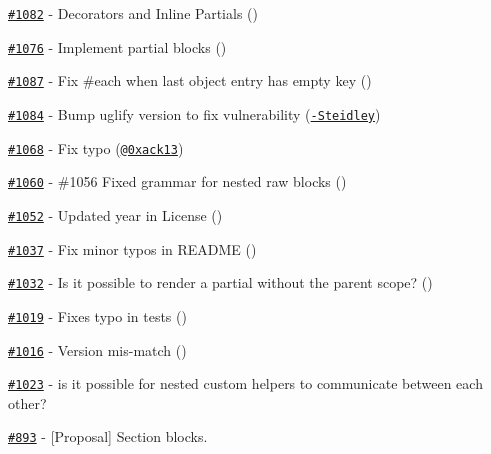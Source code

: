 \begin{DoxyItemize}
\item \href{https://github.com/wycats/handlebars.js/pull/1082}{\tt \#1082} -\/ Decorators and Inline Partials (\href{https://api.github.com/users/kpdecker}{\tt })
\item \href{https://github.com/wycats/handlebars.js/pull/1076}{\tt \#1076} -\/ Implement partial blocks (\href{https://api.github.com/users/kpdecker}{\tt })
\item \href{https://github.com/wycats/handlebars.js/pull/1087}{\tt \#1087} -\/ Fix \#each when last object entry has empty key (\href{https://api.github.com/users/denniskuczynski}{\tt })
\item \href{https://github.com/wycats/handlebars.js/pull/1084}{\tt \#1084} -\/ Bump uglify version to fix vulnerability (\href{https://api.github.com/users/John-Steidley}{\tt -\/\+Steidley})
\item \href{https://github.com/wycats/handlebars.js/pull/1068}{\tt \#1068} -\/ Fix typo (\href{https://api.github.com/users/0xack13}{\tt @0xack13})
\item \href{https://github.com/wycats/handlebars.js/pull/1060}{\tt \#1060} -\/ \#1056 Fixed grammar for nested raw blocks (\href{https://api.github.com/users/ericbn}{\tt })
\item \href{https://github.com/wycats/handlebars.js/pull/1052}{\tt \#1052} -\/ Updated year in License (\href{https://api.github.com/users/maqnouch}{\tt })
\item \href{https://github.com/wycats/handlebars.js/pull/1037}{\tt \#1037} -\/ Fix minor typos in R\+E\+A\+D\+M\+E (\href{https://api.github.com/users/tomxtobin}{\tt })
\item \href{https://github.com/wycats/handlebars.js/issues/1032}{\tt \#1032} -\/ Is it possible to render a partial without the parent scope? (\href{https://api.github.com/users/aputinski}{\tt })
\item \href{https://github.com/wycats/handlebars.js/pull/1019}{\tt \#1019} -\/ Fixes typo in tests (\href{https://api.github.com/users/aymerick}{\tt })
\item \href{https://github.com/wycats/handlebars.js/issues/1016}{\tt \#1016} -\/ Version mis-\/match (\href{https://api.github.com/users/mayankdedhia}{\tt })
\item \href{https://github.com/wycats/handlebars.js/issues/1023}{\tt \#1023} -\/ is it possible for nested custom helpers to communicate between each other?
\item \href{https://github.com/wycats/handlebars.js/issues/893}{\tt \#893} -\/ \mbox{[}Proposal\mbox{]} Section blocks.

\end{DoxyItemize}
